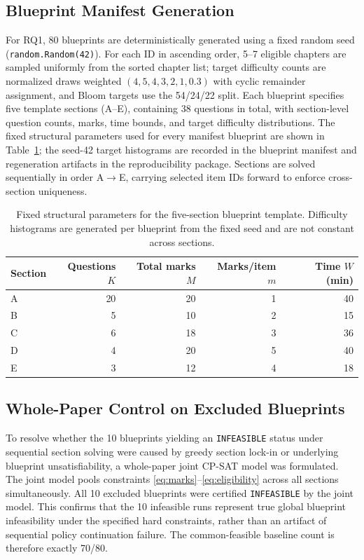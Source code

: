 \documentclass[runningheads]{llncs}
\begin{document}
\subsection{Blueprint Manifest Generation}
For RQ1, 80 blueprints are deterministically generated using a fixed random seed (\texttt{random.Random(42)}). For each ID in ascending order, 5--7 eligible chapters are sampled uniformly from the sorted chapter list; target difficulty counts are normalized draws weighted $(4,5,4,3,2,1,0.3)$ with cyclic remainder assignment, and Bloom targets use the 54/24/22 split. Each blueprint specifies five template sections (A--E), containing 38 questions in total, with section-level question counts, marks, time bounds, and target difficulty distributions. The fixed structural parameters used for every manifest blueprint are shown in Table~\ref{tab:manifest}; the seed-42 target histograms are recorded in the blueprint manifest and regeneration artifacts in the reproducibility package. Sections are solved sequentially in order A$\to$E, carrying selected item IDs forward to enforce cross-section uniqueness.

\begin{table}[t]
\caption{Fixed structural parameters for the five-section blueprint template. Difficulty histograms are generated per blueprint from the fixed seed and are not constant across sections.}
\label{tab:manifest}
\centering
\small
\begin{tabular}{@{}lrrrr@{}}
\toprule
Section & Questions $K$ & Total marks $M$ & Marks/item $m$ & Time $W$ (min) \\
\midrule
A & 20 & 20 & 1 & 40 \\
B & 5  & 10 & 2 & 15 \\
C & 6  & 18 & 3 & 36 \\
D & 4  & 20 & 5 & 40 \\
E & 3  & 12 & 4 & 18 \\
\bottomrule
\end{tabular}
\end{table}

\subsection{Whole-Paper Control on Excluded Blueprints}
To resolve whether the 10 blueprints yielding an \texttt{INFEASIBLE} status under sequential section solving were caused by greedy section lock-in or underlying blueprint unsatisfiability, a whole-paper joint CP-SAT model was formulated. The joint model pools constraints \eqref{eq:marks}--\eqref{eq:eligibility} across all sections simultaneously. All 10 excluded blueprints were certified \texttt{INFEASIBLE} by the joint model. This confirms that the 10 infeasible runs represent true global blueprint infeasibility under the specified hard constraints, rather than an artifact of sequential policy continuation failure. The common-feasible baseline count is therefore exactly 70/80.
\end{document}
